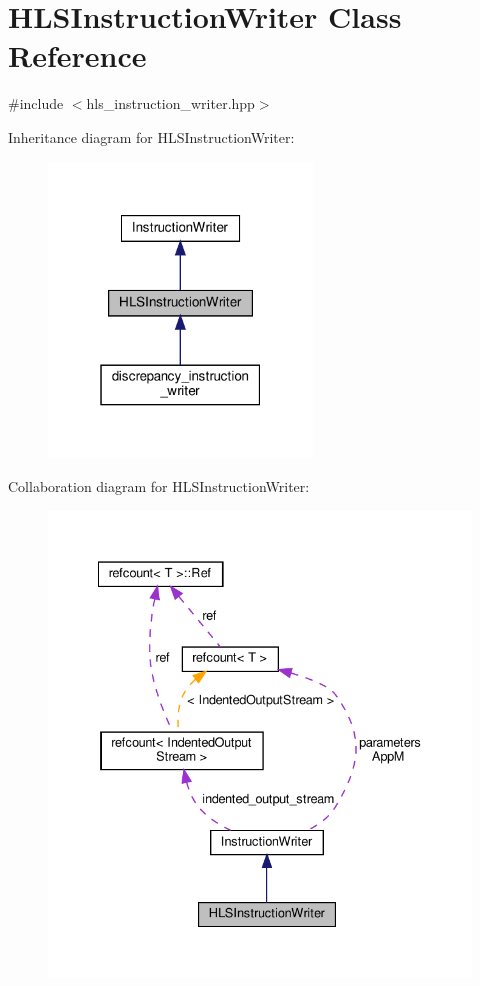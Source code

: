\hypertarget{classHLSInstructionWriter}{}\section{H\+L\+S\+Instruction\+Writer Class Reference}
\label{classHLSInstructionWriter}


{\ttfamily \#include $<$hls\+\_\+instruction\+\_\+writer.\+hpp$>$}



Inheritance diagram for H\+L\+S\+Instruction\+Writer\+:
\nopagebreak
\begin{figure}[H]
\begin{center}
\leavevmode
\includegraphics[width=199pt]{d3/d64/classHLSInstructionWriter__inherit__graph}
\end{center}
\end{figure}


Collaboration diagram for H\+L\+S\+Instruction\+Writer\+:
\nopagebreak
\begin{figure}[H]
\begin{center}
\leavevmode
\includegraphics[width=335pt]{d7/d2b/classHLSInstructionWriter__coll__graph}
\end{center}
\end{figure}
